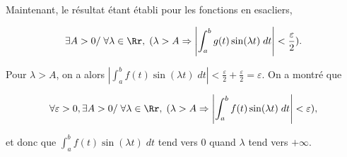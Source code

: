 {\begin{enumerate}
{Maintenant, le résultat étant établi pour les fonctions en esacliers, 

$$\exists A>0/\;\forall\lambda\in\Rr,\;
(\lambda>A\Rightarrow\left|\int_{a}^{b}g(t)\sin(\lambda t)\;dt\right|<\frac{\varepsilon}{2}).$$

Pour $\lambda>A$, on a alors $\left|\int_{a}^{b}f(t)\sin(\lambda t)\;dt\right|<\frac{\varepsilon}{2}+\frac{\varepsilon}{2}=\varepsilon$. On a montré que 

$$\forall\varepsilon>0,\exists A>0/\;\forall\lambda\in\Rr,\;(\lambda>A\Rightarrow\left|\int_{a}^{b}f(t)\sin(\lambda t)\;dt\right|<\varepsilon),$$

et donc que $\int_{a}^{b}f(t)\sin(\lambda t)\;dt$ tend vers $0$ quand $\lambda$ tend vers $+\infty$.}
\end{enumerate}
}